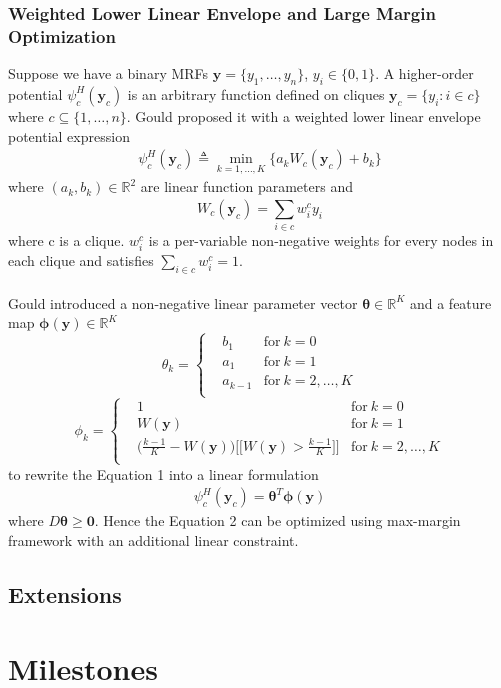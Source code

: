 \documentclass{article}
\begin{document}
		\subsubsection{Weighted Lower Linear Envelope and Large Margin Optimization}
		Suppose we have a binary MRFs $\mathbf{y}=\{y_1,\dots,y_n\}$, $y_i\in\{0,1\}$. A higher-order potential $\psi_c^H(\mathbf{y}_c)$ is an arbitrary function defined on cliques $\mathbf{y}_c=\{y_i : i\in c\}$ where $c\subseteq\{1,\dots,n\}$. Gould\cite{gouldlearning} proposed it with a weighted lower linear envelope potential expression
		\begin{align}
		\psi_c^H(\mathbf{y}_c) \triangleq \min_{k=1,\dots,K}\bigg\{a_kW_c(\mathbf{y}_c)+b_k\bigg\}
		\end{align}
		where $(a_k,b_k)\in\mathbb{R}^2$ are linear function parameters and
		$$
		W_c(\mathbf{y}_c) = \sum_{i\in c}^{}w_i^cy_i
		$$
		where c is a clique. $w_i^c$ is a per-variable non-negative weights for every nodes in each clique and satisfies $\sum_ {i\in c}^{}w_i^c=1$.\\\\
		Gould\cite{gouldlearning} introduced a non-negative linear parameter vector $\boldsymbol{\theta}\in\mathbb{R}^K$ and a feature map $\boldsymbol{\phi}(\mathbf{y})\in \mathbb{R}^K$ 
		\begin{equation*}
		\theta_k = \left\{
		\begin{aligned}
		& b_1	& \text{for} \ k=0\\
		& a_1 & \text{for}\ k=1\\
		& a_{k-1}  & \text{for} \ k=2,\dots,K\\
		\end{aligned}
		\right.
		\end{equation*}
		\begin{equation*}
		\phi_k = \left\{
		\begin{aligned}
		& 1	& \text{for} \ k=0\\
		& W(\mathbf{y}) & \text{for}\ k=1\\
		& \bigg(\frac{k-1}{K}-W(\mathbf{y}) \bigg)\bigg[\bigg[ W(\mathbf{y}) > \frac{k-1}{K}\bigg]\bigg]  & \text{for} \ k=2,\dots,K\\
		\end{aligned}
		\right.
		\end{equation*}
		to rewrite the Equation 1 into a linear formulation
		\begin{align}
		\psi_c^H(\mathbf{y}_c)=\boldsymbol{\theta}^T\boldsymbol{\phi}(\mathbf{y})
		\end{align}
		where $ D\boldsymbol{\theta}\geq \mathbf{0}$. Hence the Equation 2 can be optimized using max-margin framework with an additional linear constraint.
		

	\subsection{Extensions}


	\section{Milestones}
	
	\renewcommand\refname{Bibliography}
	
	
\end{document}

